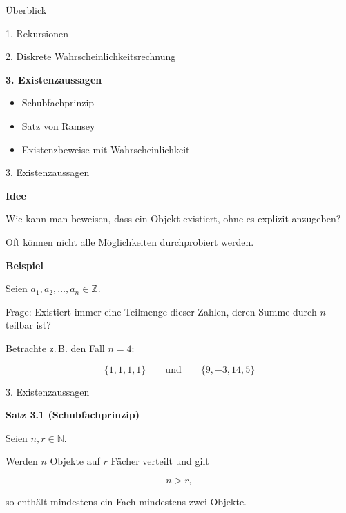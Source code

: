 \documentclass{beamer}
\begin{document}
\begin{frame}{Überblick}

1. Rekursionen

\vspace{0.3cm}

2. Diskrete Wahrscheinlichkeitsrechnung

\vspace{0.5cm}

\textbf{3. Existenzaussagen}
\begin{itemize}
    \item Schubfachprinzip
    \item Satz von Ramsey
    \item Existenzbeweise mit Wahrscheinlichkeit
\end{itemize}

\end{frame}

\begin{frame}{3. Existenzaussagen}

\textbf{Idee}

\vspace{0.3cm}

Wie kann man beweisen, dass ein Objekt existiert,
ohne es explizit anzugeben?

\vspace{0.4cm}

Oft können nicht alle Möglichkeiten
durchprobiert werden.

\vspace{0.4cm}

\textbf{Beispiel}

Seien \(a_1,a_2,\ldots,a_n\in\mathbb Z.\)

\vspace{0.2cm}

Frage: Existiert immer eine Teilmenge dieser Zahlen,
deren Summe durch \(n\) teilbar ist?

\vspace{0.3cm}

Betrachte z.\,B. den Fall \(n=4\):

\[
\{1,1,1,1\}
\qquad\text{und}\qquad
\{9,-3,14,5\}
\]

\end{frame}

\begin{frame}{3. Existenzaussagen}

\textbf{Satz 3.1 (Schubfachprinzip)}

\vspace{0.3cm}

Seien \(n,r\in\mathbb N\).

Werden \(n\) Objekte auf \(r\) Fächer verteilt und gilt

\[
n>r,
\]

so enthält mindestens ein Fach mindestens zwei Objekte.

\end{frame}
\end{document}
